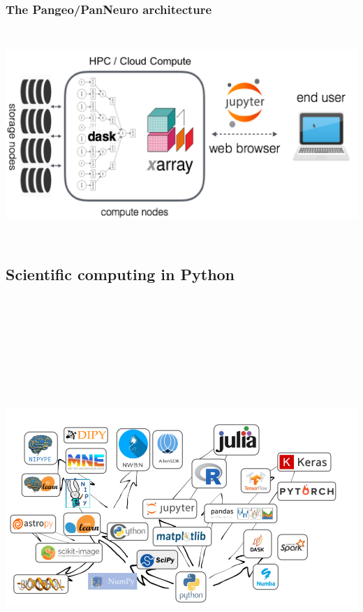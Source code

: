 \documentclass[a0, landscape]{a0poster}
\begin{document}
\begin{multicols}{3}
\begin{minipage}[b]{0.5\linewidth}
\subsubsection*{The Pangeo/PanNeuro architecture}
\includegraphics[height=8cm]{pangeo_architecture.png}
\end{minipage}


\subsection*{Scientific computing in Python}
\includegraphics[height=16cm]{python-network25.png}


\end{multicols}
\end{document}

